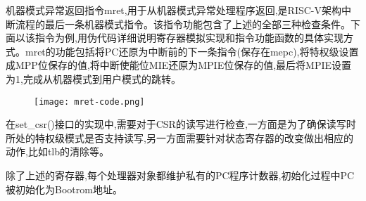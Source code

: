 机器模式异常返回指令mret,用于从机器模式异常处理程序返回,是RISC-V架构中断流程的最后一条机器模式指令。该指令功能包含了上述的全部三种检查条件。下面以该指令为例,用伪代码详细说明寄存器模拟实现和指令功能函数的具体实现方式。mret的功能包括将PC还原为中断前的下一条指令(保存在mepc),将特权级设置成MPP位保存的值,将中断使能位MIE还原为MPIE位保存的值,最后将MPIE设置为1,完成从机器模式到用户模式的跳转。
\begin{figure}[H]
    \centering
    \texttt{[image: mret-code.png]}
    \label{fig:mret-code}
\end{figure}

在set\_csr()接口的实现中,需要对于CSR的读写进行检查,一方面是为了确保读写时所处的特权级模式是否支持读写,另一方面需要针对状态寄存器的改变做出相应的动作,比如tlb的清除等。

除了上述的寄存器,每个处理器对象都维护私有的PC程序计数器,初始化过程中PC被初始化为Bootrom地址。

